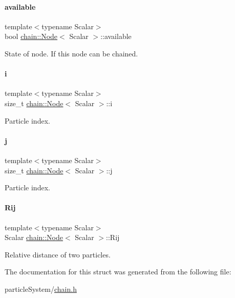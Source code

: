 \paragraph{\texorpdfstring{available}{available}}
{\footnotesize\ttfamily template$<$typename Scalar$>$ \\
bool \mbox{\hyperlink{structchain_1_1_node}{chain\+::\+Node}}$<$ Scalar $>$\+::available}

State of node. If this node can be chained. \mbox{\label{structchain_1_1_node_a289ef3bad054158a446e53481c2a9d17}} 
\paragraph{\texorpdfstring{i}{i}}
{\footnotesize\ttfamily template$<$typename Scalar$>$ \\
size\+\_\+t \mbox{\hyperlink{structchain_1_1_node}{chain\+::\+Node}}$<$ Scalar $>$\+::i}

Particle index. \mbox{\label{structchain_1_1_node_aa41c0c59d6cdd4263a72b9e5284aa3d9}} 
\paragraph{\texorpdfstring{j}{j}}
{\footnotesize\ttfamily template$<$typename Scalar$>$ \\
size\+\_\+t \mbox{\hyperlink{structchain_1_1_node}{chain\+::\+Node}}$<$ Scalar $>$\+::j}

Particle index. \mbox{\label{structchain_1_1_node_a3a9ca49370eba9c8ce1d6b2a146c93ee}} 
\paragraph{\texorpdfstring{Rij}{Rij}}
{\footnotesize\ttfamily template$<$typename Scalar$>$ \\
Scalar \mbox{\hyperlink{structchain_1_1_node}{chain\+::\+Node}}$<$ Scalar $>$\+::Rij}

Relative distance of two particles. 

The documentation for this struct was generated from the following file\+:\begin{DoxyCompactItemize}
\item 
particle\+System/\mbox{\hyperlink{chain_8h}{chain.\+h}}\end{DoxyCompactItemize}
